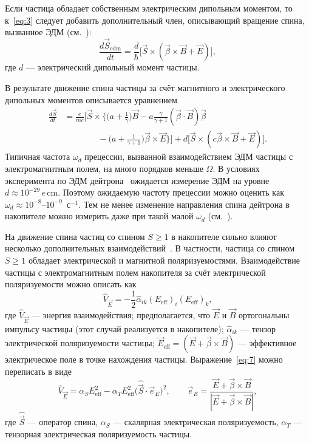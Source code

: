 \documentclass[11pt,a4paper]{article}
\newcommand{\hvec}[1]{\hat{\vec{#1}}}
\begin{document}
Если частица обладает собственным электрическим дипольным моментом,
то к~\eqref{eq:3} следует добавить дополнительный член, описывающий
вращение спина, вызванное ЭДМ (см.~\cite{FordHirt61}):
\begin{equation}
\frac{d\vec{S}_{\mathrm{edm}}}{dt}
=\frac{d}{\hbar}\bigl[\vec{S}\times(\vec{\beta}\times\vec{B}+\vec{E})\bigr],
\label{eq:5}
\end{equation}
где $d$ --- электрический дипольный момент частицы.

В результате движение спина частицы за счёт магнитного и электрического
дипольных моментов описывается уравнением
\begin{equation}
\begin{aligned}
\frac{d\vec{S}}{dt}
&=\frac{e}{mc}\Biggl[\vec{S}\times\Biggl\{
\Biggl(a+\frac{1}{\gamma}\Biggr)\vec{B}
-a\frac{\gamma}{\gamma+1}(\vec{\beta}\cdot\vec{B})\vec{\beta}\\
&\qquad\qquad
-\Biggl(a+\frac{1}{\gamma+1}\Biggr)\vec{\beta}\times\vec{E}
\Biggr\}\Biggr]
+d\bigl[\vec{S}\times(c\vec{\beta}\times\vec{B}+\vec{E})\bigr].
\end{aligned}
\label{eq:6}
\end{equation}
Типичная частота $\omega_d$ прецессии, вызванной взаимодействием ЭДМ
частицы с электромагнитным полем, на много порядков меньше $\Omega$.
В условиях эксперимента по ЭДМ дейтрона~\cite{Farley04,Orlov05}
ожидается измерение ЭДМ на уровне $d\approx 10^{-29}\,e\,\mathrm{cm}$.
Поэтому ожидаемую частоту прецессии можно оценить как
$\omega_d\approx 10^{-8}$--$10^{-9}$~с$^{-1}$. Тем не менее изменение
направления спина дейтрона в накопителе можно измерить даже при такой
малой $\omega_d$ (см.~\cite{Onderwater05,Farley04,Orlov05}).

На движение спина частиц со спином $S\geqslant 1$ в накопителе сильно
влияют несколько дополнительных взаимодействий~\cite{BarySTORI05,BaryShirvel05,Bary0504064,BaryGurin05}.
В частности, частица со спином $S\geqslant 1$ обладает электрической
и магнитной поляризуемостями. Взаимодействие частицы с электромагнитным
полем накопителя за счёт электрической поляризуемости можно описать как
\begin{equation}
\hat{V}_{\vec{E}}=-\frac12\hat{\alpha}_{ik}(E_{\mathrm{eff}})_i(E_{\mathrm{eff}})_k,
\label{eq:7}
\end{equation}
где $\hat{V}_{\vec{E}}$ --- энергия взаимодействия; предполагается, что
$\vec{E}$ и $\vec{B}$ ортогональны импульсу частицы (этот случай реализуется
в накопителе); $\hat{\alpha}_{ik}$ --- тензор электрической поляризуемости
частицы; $\vec{E}_{\mathrm{eff}}=(\vec{E}+\vec{\beta}\times\vec{B})$ ---
эффективное электрическое поле в точке нахождения частицы.
Выражение~\eqref{eq:7} можно переписать в виде
\begin{equation}
\hat{V}_{\vec{E}}
=\alpha_S E_{\mathrm{eff}}^2
-\alpha_T E_{\mathrm{eff}}^2\bigl(\hvec{S}\cdot\vec{e}_E\bigr)^2,\qquad
\vec{e}_E=\frac{\vec{E}+\vec{\beta}\times\vec{B}}{|\vec{E}+\vec{\beta}\times\vec{B}|},
\label{eq:8}
\end{equation}
где $\hvec{S}$ --- оператор спина, $\alpha_S$ --- скалярная электрическая
поляризуемость, $\alpha_T$ --- тензорная электрическая поляризуемость частицы.
\end{document}
